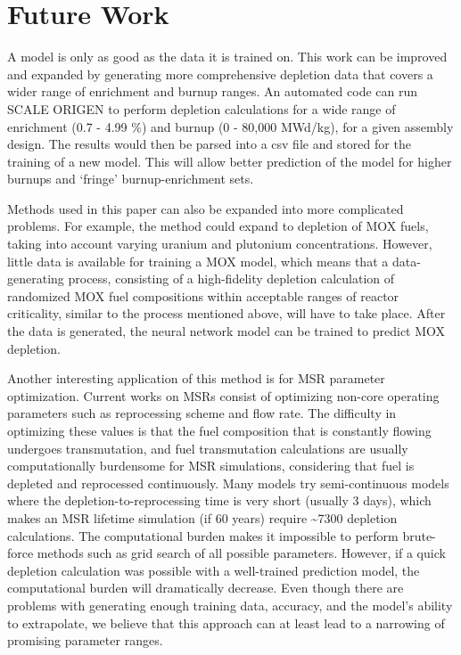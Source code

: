 \section{Future Work}

A model is only as good as the data it is trained on.
This work can be improved and expanded by generating
more comprehensive depletion data that covers a wider
range of enrichment and burnup ranges. An automated
code can run SCALE ORIGEN to perform depletion calculations
for a wide range of enrichment (0.7 - 4.99 \%) and burnup (0 - 80,000 MWd/kg),
for a given assembly design. The results
would then be parsed into a csv file and stored for
the training of a new model. This will allow better
prediction of the model for higher burnups and `fringe'
burnup-enrichment sets.

Methods used in this paper can also be expanded into more
complicated problems. For example, the method
could expand to depletion of \gls{MOX} fuels, taking
into account varying uranium and plutonium concentrations.
However, little data is available
for training a \gls{MOX} model, which means that a
data-generating process, consisting of a high-fidelity
depletion calculation of randomized \gls{MOX} fuel
compositions within acceptable ranges of reactor
criticality, similar to the process mentioned above,
will have to take place. After the data
is generated, the neural network model can be trained
to predict \gls{MOX} depletion.

Another interesting application of this method is for
\gls{MSR} parameter optimization. Current works on
\glspl{MSR} consist of optimizing non-core operating
parameters such as reprocessing scheme and flow rate.
The difficulty in optimizing these values is that the
fuel composition that is constantly flowing undergoes
transmutation, and fuel transmutation calculations
are usually computationally burdensome for \gls{MSR}
simulations, considering that fuel is depleted and
reprocessed continuously. Many models try semi-continuous
models where the depletion-to-reprocessing time is
very short (usually 3 days), which makes an
\gls{MSR} lifetime simulation (if 60 years)
require \textasciitilde 7300 depletion calculations.
The computational burden
makes it impossible to perform brute-force methods
such as grid search of all possible parameters.
However, if a quick depletion calculation was possible
with a well-trained prediction model, the
computational burden will dramatically decrease.
Even though there are problems with generating enough
training data, accuracy, and the model's ability to
extrapolate, we believe that this approach can
at least lead to a narrowing of promising parameter
ranges.